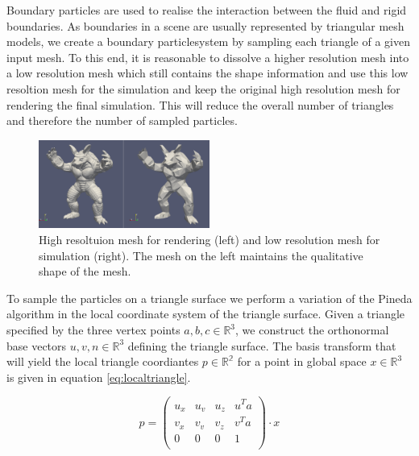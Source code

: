 \documentclass[11pt, letterpaper, twocolumn]{article}
\begin{document}
Boundary particles are used to realise the interaction between the fluid and rigid boundaries. As boundaries in a scene are usually represented by triangular mesh models, we create a boundary particlesystem by sampling each triangle of a given input mesh. To this end, it is reasonable to dissolve a higher resolution mesh into a low resolution mesh which still contains the shape information and use this low resoltion mesh for the simulation and keep the original high resolution mesh for rendering the final simulation. This will reduce the overall number of triangles and therefore the number of sampled particles.

\begin{figure}[ht]
    \centering
    \includegraphics[width=0.5\textwidth]{images/mesh.png}
    \caption{High resoltuion mesh for rendering (left) and low resolution mesh for simulation (right). The mesh on the left maintains the qualitative shape of the mesh.}
    \label{fig:mesh}
\end{figure}


To sample the particles on a triangle surface we perform a variation of the Pineda algorithm \cite{pineda1988} in the local coordinate system of the triangle surface. Given a triangle specified by the three vertex points \(a, b, c \in \mathbb{R}^3\), we construct the orthonormal base vectors \(u,v,n \in \mathbb{R}^3\) defining the triangle surface. The basis transform that will yield the local triangle coordiantes \(p \in \mathbb{R^2}\) for a point in global space \(x \in \mathbb{R}^3\) is given in equation \ref{eq:localtriangle}.

\begin{equation}
  p = 
  \begin{pmatrix}
    u_x & u_v & u_z & u^T a\\
    v_x & v_v & v_z & v^T a\\
    0 & 0 & 0 & 1 \\
  \end{pmatrix}
  \cdot x 
\label{eq:localtriangle}
\end{equation}
\end{document}

